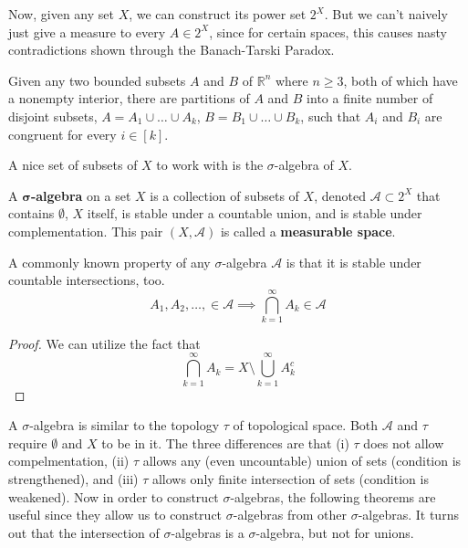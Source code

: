 \documentclass{article}
\begin{document}
Now, given any set $X$, we can construct its power set $2^X$. But we can't naively just give a measure to every $A \in 2^X$, since for certain spaces, this causes nasty contradictions shown through the Banach-Tarski Paradox. 

\begin{theorem}
Given any two bounded subsets $A$ and $B$ of $\mathbb{R}^n$ where $n \geq 3$, both of which have a nonempty interior, there are partitions of $A$ and $B$ into a finite number of disjoint subsets, $A = A_1 \cup \ldots \cup A_k$, $B = B_1 \cup \ldots \cup B_k$, such that $A_i$ and $B_i$ are congruent for every $i \in [k]$. 
\end{theorem}

A nice set of subsets of $X$ to work with is the $\sigma$-algebra of $X$. 

\begin{definition}
A \textbf{$\boldsymbol{\sigma}$-algebra} on a set $X$ is a collection  of subsets of $X$, denoted $\mathcal{A} \subset 2^X$ that contains $\emptyset$, $X$ itself, is stable under a countable union, and is stable under complementation. This pair $(X, \mathcal{A})$ is called a \textbf{measurable space}. 
\end{definition}

\begin{lemma}
A commonly known property of any $\sigma$-algebra $\mathcal{A}$ is that it is stable under countable intersections, too. 
\[A_1, A_2, \ldots, \in \mathcal{A} \implies \bigcap_{k=1}^\infty A_k \in \mathcal{A}\]
\end{lemma}
\begin{proof}
We can utilize the fact that 
\[\bigcap_{k=1}^\infty A_k = X \setminus \bigcup_{k=1}^\infty A_k^c\]
\end{proof}

A $\sigma$-algebra is similar to the topology $\tau$ of topological space. Both $\mathcal{A}$ and $\tau$ require $\emptyset$ and $X$ to be in it. The three differences are that (i) $\tau$ does not allow compelmentation, (ii) $\tau$ allows any (even uncountable) union of sets (condition is strengthened), and (iii) $\tau$ allows only finite intersection of sets (condition is weakened). Now in order to construct $\sigma$-algebras, the following theorems are useful since they allow us to construct $\sigma$-algebras from other $\sigma$-algebras. It turns out that the intersection of $\sigma$-algebras is a $\sigma$-algebra, but not for unions. 
\end{document}
